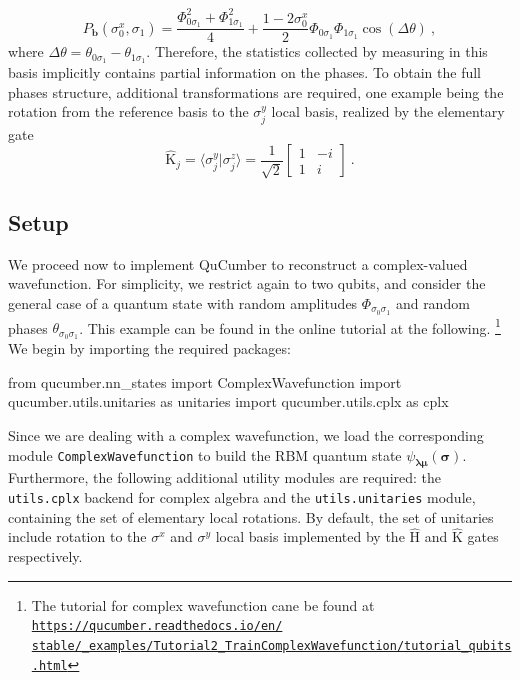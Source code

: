 \documentclass[submission, Phys, hidelinks]{SciPost}
\begin{document}
\begin{equation}
	P_{\bm{b}}(\sigma_0^x,\sigma_1)=\frac{\Phi_{0\sigma_1}^2+\Phi_{1\sigma_1}^2}{4}+\frac{1-2\sigma_0^x}{2}\Phi_{0\sigma_1}\Phi_{1\sigma_1}\cos(\Delta\theta)\:,
\end{equation}
where $\Delta\theta=\theta_{0\sigma_1}-\theta_{1\sigma_1}$. Therefore, the statistics collected by measuring in this basis implicitly contains partial information on the phases. To obtain the full phases structure, additional transformations are required, one example being the rotation from the reference basis to the $\sigma^y_j$ local basis, realized by
the elementary gate
\begin{equation}
		\hat{\mathrm{K}}_j=\langle\sigma_j^y|\sigma_j^z\rangle=\frac{1}{\sqrt{2}}\begin{bmatrix}1 & -i\\
	1 & i
\end{bmatrix}\:.
\end{equation}


\subsection{Setup}
We proceed now to implement QuCumber to reconstruct a complex-valued wavefunction. For simplicity, we restrict again to two qubits, and consider the general case of a quantum state with random amplitudes $\Phi_{\sigma_0\sigma_1}$ and random phases $\theta_{\sigma_0\sigma_1}$. This example can be found in the online tutorial at the following.
\footnote{The tutorial for complex wavefunction cane be found at
			\href{https://qucumber.readthedocs.io/en/stable/\_examples/Tutorial2_TrainComplexWavefunction/tutorial_qubits.html
        }{\texttt{https://qucumber.readthedocs.io/en/\\stable/\_examples/Tutorial2\_TrainComplexWavefunction/tutorial\_qubits.html}}
}
We begin by importing the required packages:

\begin{python}
from qucumber.nn_states import ComplexWavefunction
import qucumber.utils.unitaries as unitaries
import qucumber.utils.cplx as cplx
\end{python}
Since we are dealing with a complex wavefunction, we load the corresponding module 
\verb|ComplexWavefunction| to build the RBM quantum state $\psi_{\bm{\lambda\mu}}(\bm{\sigma})$. Furthermore, the following additional utility modules are required: the \verb|utils.cplx| backend for complex algebra and the \verb|utils.unitaries| module, containing the set of elementary local rotations. By default, the set of unitaries include rotation to the $\sigma^x$ and $\sigma^y$ local basis implemented by the $\hat{\mathrm{H}}$ and $\hat{\mathrm{K}}$ gates respectively.
\end{document}
